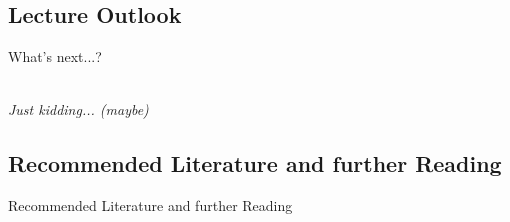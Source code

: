 \subsection{Lecture Outlook}

\begin{frame}{What's next...?}{}
	\vfill
	\begin{center}
		{\Huge{}} \\
		\textit{Just kidding... (maybe)}
	\end{center}
	\vfill
\end{frame}


\subsection{Recommended Literature and further Reading}

\begin{frame}{Recommended Literature and further Reading}{}
	\footnotesize
	\begin{thebibliography}{2}

	\end{thebibliography}
\end{frame}


\makethanks

